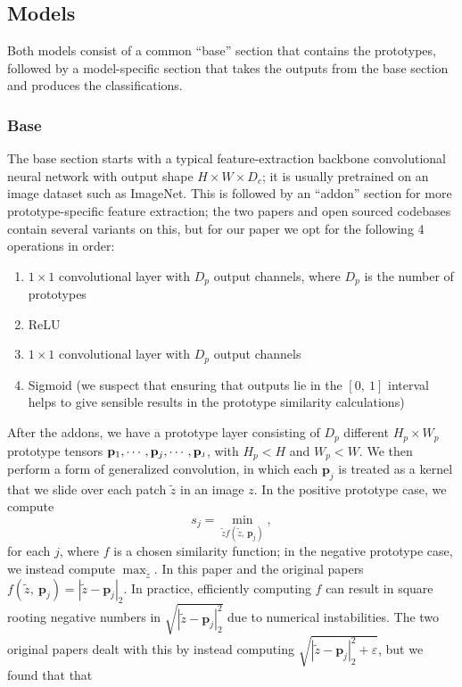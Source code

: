 \documentclass{rescience}
\begin{document}
\subsection{Models}
Both models consist of a common ``base'' section that contains the prototypes, followed by a model-specific section that takes the outputs from the base section and produces the classifications.

\subsubsection{Base}
The base section starts with a typical feature-extraction backbone convolutional neural network with output shape \(H\times W\times D_c\); it is usually pretrained on an image dataset such as ImageNet. This is followed by an ``addon'' section for more prototype-specific feature extraction; the two papers and open sourced codebases contain several variants on this, but for our paper we opt for the following 4 operations in order:
\begin{enumerate}
\item \(1\times 1\) convolutional layer with \(D_p\) output channels, where \(D_p\) is the number of prototypes
\item ReLU
\item \(1\times 1\) convolutional layer with \(D_p\) output channels
\item Sigmoid (we suspect that ensuring that outputs lie in the \([0,\ 1]\) interval helps to give sensible results in the prototype similarity calculations)
\end{enumerate}
After the addons, we have a prototype layer consisting of \(D_p\) different \(H_p\times W_p\) prototype tensors \(\mathbf{p}_1, \cdots, \mathbf{p}_j, \cdots, \mathbf{p}_\mathrm{\textsc{j}}\), with \(H_p < H\) and \(W_p < W\). We then perform a form of generalized convolution, in which each \(\mathbf{p}_j\) is treated as a kernel that we slide over each patch \(\tilde{z}\) in an image \(z\). In the positive prototype case, we compute
\[s_j=\min_{\tilde{z} f(\tilde{z},\ \mathbf{p}_j)},\]
for each \(j\), where \(f\) is a chosen similarity function; in the negative prototype case, we instead compute \(\max_{\tilde{z}}\). In this paper and the original papers \(f(\tilde{z},\ \mathbf{p}_j)=|\tilde{z} - \mathbf{p}_j|_2\). In practice, efficiently computing \(f\) can result in square rooting negative numbers in  \(\sqrt{|\tilde{z} - \mathbf{p}_j|_2^2}\) due to numerical instabilities. The two original papers dealt with this by instead computing \(\sqrt{|\tilde{z} - \mathbf{p}_j|_2^2 + \varepsilon}\), but we found that that 
\end{document}
